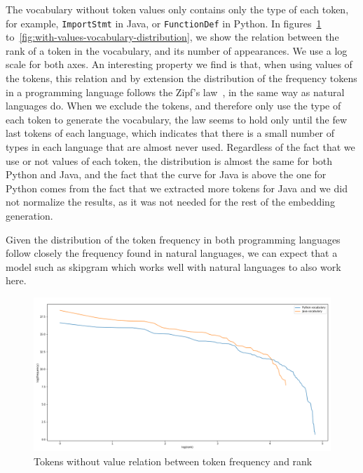 The vocabulary without token values only contains only the type of each token,
for example, \lstinline{ImportStmt} in Java, or \lstinline{FunctionDef} in
Python. In figures~\ref{fig:no-values-vocabulary-distribution}
to~\ref{fig:with-values-vocabulary-distribution}, we show the relation between
the rank of a token in the vocabulary, and its number of appearances. We use a
log scale for both axes. An interesting property we find is that, when using
values of the tokens, this relation and by extension the distribution of the
frequency tokens in a programming language follows the Zipf's
law~\cite{piantadosi2013zipf}, in the same way as natural languages do.
When we exclude the tokens, and therefore only use the type of each token to
generate the vocabulary, the law seems to hold only until the few last tokens of
each language, which indicates that there is a small number of types in each
language that are almost never used. Regardless of the fact that we use or not
values of each token, the distribution is almost the same for both Python and
Java, and the fact that the curve for Java is above the one for Python comes
from the fact that we extracted more tokens for Java and we did not normalize
the results, as it was not needed for the rest of the embedding generation.

Given the distribution of the token frequency in both programming languages
follow closely the frequency found in natural languages, we can expect that a
model such as skipgram which works well with natural languages to also work
here.

\begin{figure}
  \centering\includegraphics[width=14cm]{images/distribution-without-values.png}
  \caption{\label{fig:no-values-vocabulary-distribution}Tokens without value
    relation between token frequency and rank}
\end{figure}

